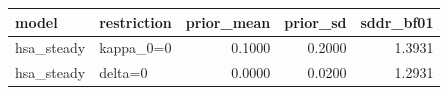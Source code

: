\begin{tabular}{llrrr}
\toprule
model & restriction & prior\_mean & prior\_sd & sddr\_bf01 \\
\midrule
hsa\_steady & kappa\_0=0 & 0.1000 & 0.2000 & 1.3931 \\
hsa\_steady & delta=0 & 0.0000 & 0.0200 & 1.2931 \\
\bottomrule
\end{tabular}
